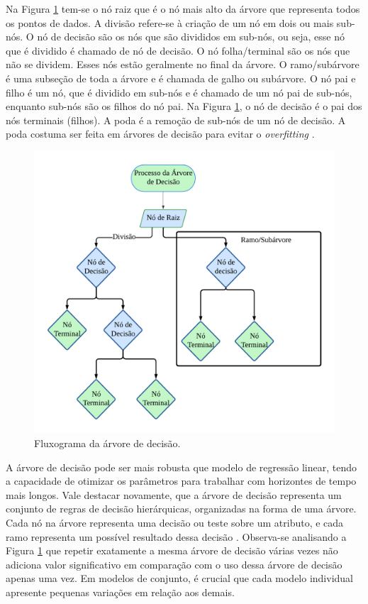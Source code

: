  Na Figura \ref{fig:decison} tem-se o nó raiz que é o nó mais alto da árvore que representa todos os pontos de dados. A divisão refere-se à criação de um nó em dois ou mais sub-nós.
 O nó de decisão são os nós que são divididos em sub-nós, ou seja, esse nó que é dividido é chamado de nó de decisão. O nó folha/terminal são os nós que não se dividem. Esses nós estão geralmente no final da árvore. O ramo/subárvore é uma subseção de toda a árvore e é chamada de galho ou subárvore. O nó pai e filho é um nó, que é dividido em sub-nós e é chamado de um nó pai de sub-nós, enquanto sub-nós são os filhos do nó pai. Na Figura \ref{fig:decison}, o nó de decisão é o pai dos nós terminais (filhos).
 A poda é a remoção de sub-nós de um nó de decisão. A poda costuma ser feita em árvores de decisão para evitar o \textit{overfitting}  \cite{decision}.
 
 \begin{figure}[H]
 	\centering
 	\caption{Fluxograma da árvore de decisão.}
 	\label{fig:decison}
 	\includegraphics[width=0.7\linewidth]{Modelos/Figuras/decison.pdf}
 	
 \end{figure}
  
 A árvore de decisão pode ser mais robusta que modelo de regressão linear, tendo a capacidade de otimizar os parâmetros para trabalhar com horizontes de tempo mais longos. Vale destacar novamente, que a árvore de decisão representa um conjunto de regras de decisão hierárquicas, organizadas na forma de uma árvore. Cada nó na árvore representa uma decisão ou teste sobre um atributo, e cada ramo representa um possível resultado dessa decisão \cite{GIFFORD2023100296}. Observa-se analisando a Figura \ref{fig:decison} que repetir exatamente a mesma árvore de decisão várias vezes não adiciona valor significativo em comparação com o uso dessa árvore de decisão apenas uma vez. Em modelos de conjunto, é crucial que cada modelo individual apresente pequenas variações em relação aos demais.
 

